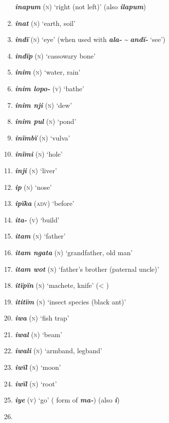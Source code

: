 \begin{enumerate}[noitemsep, label={}, align=left, widest=190, labelsep=1ex,leftmargin=*,itemindent=-10pt]
\textbf{\textit{inapum}} (\textsc{n)} ‘right (not left)’ (also \textbf{\textit{ilapum}}) \item
\textbf{\textit{inat}} (\textsc{n)} ‘earth, soil’ \item
\textbf{\textit{indï}} (\textsc{n)} ‘eye’ (when used with \textbf{\textit{ala-}} \textit{{\textasciitilde}} \textbf{\textit{andï-}} ‘see’) \item
\textbf{\textit{indïp}} (\textsc{n)} ‘cassowary bone’ \item
\textbf{\textit{inim}} (\textsc{n)} ‘water, rain’ \item
\textbf{\textit{inim lopo-}} (\textsc{v)} ‘bathe’ \item
\textbf{\textit{inim nji}} (\textsc{n)} ‘dew’ \item
\textbf{\textit{inim pul}} (\textsc{n)} ‘pond’ \item
\textbf{\textit{inïmbï}} (\textsc{n)} ‘vulva’ \item
\textbf{\textit{inïmi}} (\textsc{n)} ‘hole’ \item
\textbf{\textit{inji}} (\textsc{n)} ‘liver’ \item
\textbf{\textit{ip}} (\textsc{n)} ‘nose’ \item
\textbf{\textit{ipïka}} (\textsc{adv)} ‘before’ \item
\textbf{\textit{ita-}} (\textsc{v)} ‘build’ \item
\textbf{\textit{itam}} (\textsc{n)} ‘father’ \item
\textbf{\textit{itam ngata}} (\textsc{n)} ‘grandfather, old man’ \item
\textbf{\textit{itam wot}} (\textsc{n)} ‘father’s brother (paternal uncle)’ \item
\textbf{\textit{itïpïn}} (\textsc{n)} ‘machete, knife’ (< ) \item
\textbf{\textit{ititïm}} (\textsc{n)} ‘insect species (black ant)’ \item
\textbf{\textit{iwa}} (\textsc{n)} ‘fish trap’ \item
\textbf{\textit{iwal}} (\textsc{n)} ‘beam’ \item
\textbf{\textit{iwali}} (\textsc{n)} ‘armband, legband’ \item
\textbf{\textit{iwïl}} (\textsc{n)} ‘moon’ \item
\textbf{\textit{iwïl}} (\textsc{n)} ‘root’ \item
\textbf{\textit{iye}} (\textsc{v)} ‘go’ (  form of \textbf{\textit{ma-}}) (also \textbf{\textit{i}}) \item

\end{enumerate}

